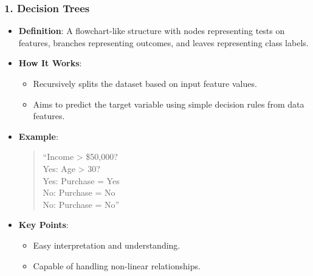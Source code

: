 \documentclass[aspectratio=169]{beamer}
\begin{document}
\begin{frame}[fragile]
    \frametitle{1. Decision Trees}
    \begin{itemize}
        \item \textbf{Definition}: A flowchart-like structure with nodes representing tests on features, branches representing outcomes, and leaves representing class labels.
        \item \textbf{How It Works}:
        \begin{itemize}
            \item Recursively splits the dataset based on input feature values.
            \item Aims to predict the target variable using simple decision rules from data features.
        \end{itemize}
        \item \textbf{Example}:
            \begin{quote}
                ``Income > \$50,000? \\ Yes: Age > 30? \\ Yes: Purchase = Yes \\ No: Purchase = No \\ No: Purchase = No''
            \end{quote}
        \item \textbf{Key Points}:
        \begin{itemize}
            \item Easy interpretation and understanding.
            \item Capable of handling non-linear relationships.
        \end{itemize}
    \end{itemize}
\end{frame}
\end{document}
